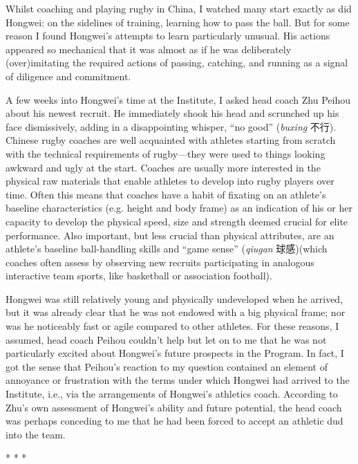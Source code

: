 \begin{CJK}{UTF8}{gbsn}
Whilst coaching and playing rugby in China, I watched many start exactly as did Hongwei: on the sidelines of training, learning how to pass the ball. But for some reason I found Hongwei’s attempts to learn particularly unusual.  His actions appeared so mechanical that it was almost as if he was deliberately (over)imitating the required actions of passing, catching, and running as a signal of diligence and commitment.

A few weeks into Hongwei’s time at the Institute, I asked head coach Zhu Peihou about his newest recruit.  He immediately shook his head and scrunched up his face dismissively, adding in a disappointing whisper, ``no good'' (\textit{buxing} 不行).  Chinese rugby coaches are well acquainted with athletes starting from scratch with the technical requirements of rugby---they were used to things looking awkward and ugly at the start.  Coaches are usually more interested in the physical raw materials that enable athletes to develop into rugby players over time.  Often this means that coaches have a habit of fixating on an athlete's baseline characteristics (e.g. height and body frame) as an indication of his or her capacity to develop the physical speed, size and strength deemed crucial for elite performance.  Also important, but less crucial than physical attributes, are an athlete’s baseline ball-handling skills and ``game sense'' (\textit{qiugan} 球感)(which coaches often assess by observing new recruits participating in analogous interactive team sports, like basketball or association football).

Hongwei was still relatively young and physically undeveloped when he arrived, but it was already clear that he was not endowed with a big physical frame; nor was he noticeably fast or agile compared to other athletes.  For these reasons, I assumed, head coach Peihou couldn’t help but let on to me that he was not particularly excited about Hongwei's future prospects in the Program.  In fact, I got the sense that Peihou's reaction to my question contained an element of annoyance or frustration with the terms under which Hongwei had arrived to the Institute, i.e., via the arrangements of Hongwei’s athletics coach.  According to Zhu's own assessment of Hongwei's ability and future potential, the head coach was perhaps conceding to me that he had been forced to accept an athletic dud into the team.


\begin{center}
  * * *
\end{center}


\end{CJK}
